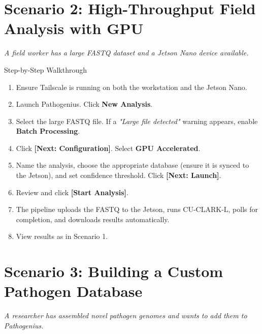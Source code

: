 \documentclass[12pt,a4paper]{report}
\newcommand{\btn}[1]{\textbf{\textcolor{primary}{[#1]}}}
\begin{document}
\section{Scenario 2: High-Throughput Field Analysis with GPU}

\textit{A field worker has a large FASTQ dataset and a Jetson Nano device available.}

\begin{stepbox}{Step-by-Step Walkthrough}
\begin{enumerate}[leftmargin=1em, itemsep=2pt]
  \item Ensure Tailscale is running on both the workstation and the Jetson Nano.
  \item Launch Pathogenius. Click \textbf{New Analysis}.
  \item Select the large FASTQ file. If a \textit{"Large file detected"} warning appears, enable \textbf{Batch Processing}.
  \item Click \btn{Next: Configuration}. Select \textbf{GPU Accelerated}.
  \item Name the analysis, choose the appropriate database (ensure it is synced to the Jetson), and set confidence threshold. Click \btn{Next: Launch}.
  \item Review and click \btn{Start Analysis}.
  \item The pipeline uploads the FASTQ to the Jetson, runs CU-CLARK-L, polls for completion, and downloads results automatically.
  \item View results as in Scenario 1.
\end{enumerate}
\end{stepbox}

\section{Scenario 3: Building a Custom Pathogen Database}

\textit{A researcher has assembled novel pathogen genomes and wants to add them to Pathogenius.}
\end{document}
